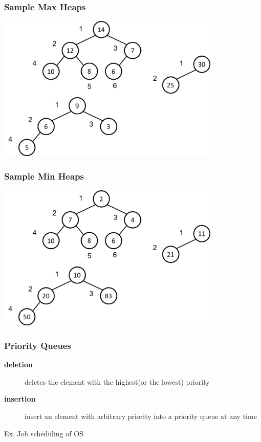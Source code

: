 \documentclass[newPxFont,sthlmFooter,nooffset]{beamer}
\begin{document}
\begin{frame}[t]
  \frametitle{Sample Max Heaps}
  \begin{center}
    \includegraphics[width=0.8\textwidth]{figures/fig12_sample_heap.png}
  \end{center}

\end{frame}


\begin{frame}[t]
  \frametitle{Sample Min Heaps}
  \begin{center}
    \includegraphics[width=0.8\textwidth]{figures/fig12_sample_heap1.png}
  \end{center}

\end{frame}


\begin{frame}[t]
  \frametitle{Priority Queues}
  \begin{description}
  \item [\textbf{deletion}] deletes the element with the highest(or
    the lowest) priority
  \item [\textbf{insertion}] insert an element with arbitrary priority
    into a priority queue at any time
  \end{description}
Ex. Job scheduling of OS
\end{frame}
\end{document}

